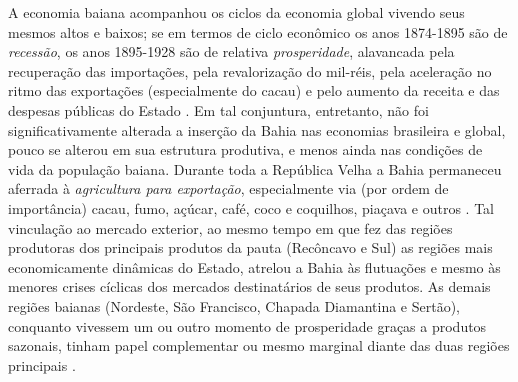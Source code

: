 A economia baiana acompanhou os ciclos da economia global vivendo seus mesmos altos e baixos; se em termos de ciclo econômico os anos 1874-1895 são de \textit{recessão}, os anos 1895-1928 são de relativa \textit{prosperidade}, alavancada pela recuperação das importações, pela revalorização do mil-réis, pela aceleração no ritmo das exportações (especialmente do cacau) e pelo aumento da receita e das despesas públicas do Estado \cite[p.~28-29]{CPE1980}. Em tal conjuntura, entretanto, não foi significativamente alterada a inserção da Bahia nas economias brasileira e global, pouco se alterou em sua estrutura produtiva, e menos ainda nas condições de vida da população baiana. Durante toda a República Velha a Bahia permaneceu aferrada à \textit{agricultura para exportação}, especialmente via (por ordem de importância) cacau, fumo, açúcar, café, coco e coquilhos, piaçava e outros \cite[p.~77;110]{CPE1980}. Tal vinculação ao mercado exterior, ao mesmo tempo em que fez das regiões produtoras dos principais produtos da pauta (Recôncavo e Sul) as regiões mais economicamente dinâmicas do Estado, atrelou a Bahia às flutuações e mesmo às menores crises cíclicas dos mercados destinatários de seus produtos. As demais regiões baianas (Nordeste, São Francisco, Chapada Diamantina e Sertão), conquanto vivessem um ou outro momento de prosperidade graças a produtos sazonais, tinham papel complementar ou mesmo marginal diante das duas regiões principais \cite[p.~77]{CPE1980}. 

